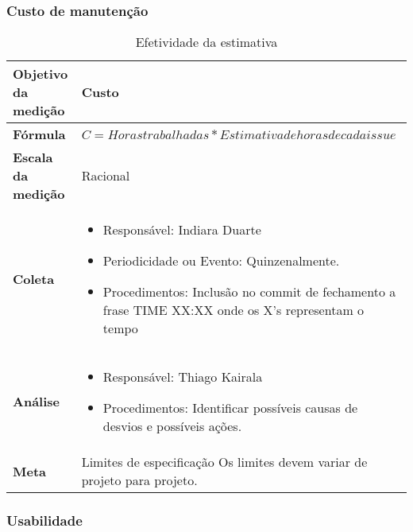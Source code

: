 \subsubsection{Custo de manutenção}


\begin{table}[H]
\centering
\begin{tabular}{|p{4cm}|p{7cm}|}
\hline
	\textbf{Objetivo da medição} &
	Custo
	\\ \hline
	\textbf{Fórmula} &
	$C = Horas trabalhadas * Estimativa de horas de cada issue$
	\\ \hline
	\textbf{Escala da medição} &
	Racional
	\\ \hline
	\textbf{Coleta} &
	\begin{itemize}
		\item{Responsável: Indiara Duarte}
		\item{Periodicidade ou Evento: Quinzenalmente.}
		\item{Procedimentos:  Inclusão no commit de fechamento a frase TIME XX:XX onde os X's representam o tempo}
	\end{itemize}
	\\ \hline
	\textbf{Análise} &
	\begin{itemize}
		\item Responsável: Thiago Kairala
		\item Procedimentos: Identificar possíveis causas de desvios e possíveis ações.
	\end{itemize}
	\\ \hline
	\textbf{Meta} &
	Limites de especificação
		Os limites devem variar de projeto para projeto.
  \\ \hline
\end{tabular}
\caption{Efetividade da estimativa}
\label{tab:efetividade_estimativa}
\end{table}

\subsubsection{Usabilidade}

